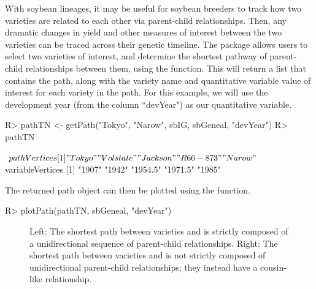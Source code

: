 \documentclass[article,shortnames]{jss}
\begin{document}
With soybean lineages, it may be useful for soybean breeders to track how two varieties are related to each other via parent-child relationships. Then, any dramatic changes in yield and other measures of interest between the two varieties can be traced across their genetic timeline. The  package allows users to select two varieties of interest, and determine the shortest pathway of parent-child relationships between them, using the  function. This will return a list that contains the path, along with the variety name and quantitative variable value of interest for each variety in the path. For this example, we will use the development year (from the column ``devYear") as our quantitative variable.

\begin{CodeChunk}
\begin{CodeInput}
R> pathTN <- getPath("Tokyo", "Narow", sbIG, sbGeneal, "devYear")
R> pathTN
\end{CodeInput}
\begin{CodeOutput}
$pathVertices
[1] "Tokyo"    "Volstate" "Jackson"  "R66-873"  "Narow"
$variableVertices
[1] "1907"   "1942"   "1954.5" "1971.5" "1985"
\end{CodeOutput}
\end{CodeChunk}

The returned path object can then be plotted using the  function.

\begin{Code}
R> plotPath(pathTN, sbGeneal, "devYear")
\end{Code}

\begin{figure}[h]
    \centering
    \caption{Left: The shortest path between varieties  and  is strictly composed of a unidirectional sequence of parent-child relationships. Right: The shortest path between varieties  and  is not strictly composed of unidirectional parent-child relationships; they instead have a cousin-like relationship.}
    \label{fig:pathTNZB}
\end{figure}
\end{document}
